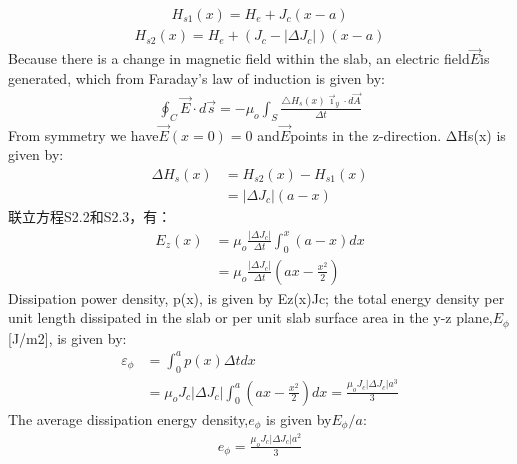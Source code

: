 \begin{align*}%
H_{s1}(x)=H_{e}+J_{c}(x-a)\tag{S2.1a}
\end{align*}
\begin{align*}%
H_{s2}(x)=H_{e}+(J_{c}-| \Delta J_{c}|)(x-a)\tag{S2.1b}
\end{align*}
Because there is a change in magnetic field
within the slab, an electric field$\vec{E}$is generated,
which from Faraday’s law of induction is
given by:
\begin{align*}%
\oint_{C}\vec{E}\cdot d\vec{s}=-\mu_{o}\int_{S}\frac{\triangle H_{s}(x)\vec{\imath}_{y}\cdot d\vec{A}}{\Delta t} \tag{S2.2}
\end{align*}
From symmetry we have$\vec{E}(x = 0) = 0$ and$\vec{E}$points in the z-direction. ΔHs(x)
is given by:
\begin{align*}%
\Delta H_{s}(x)&=H_{s2}(x)-H_{s1}(x)\\
&=|\Delta J_{c}|(a-x)\tag{S2.3}
\end{align*}
联立方程S2.2和S2.3，有：
\begin{align*}%
E_{z}(x)&=\mu_{o}\frac{|\Delta J_{c}|}{\Delta t}\int_{0}^{x}(a-x)dx\\
&=\mu_{o}\frac{|\Delta J_{c}|}{\Delta t}(ax-\frac{x^{2}}{2})\tag{S2.4}
\end{align*}
Dissipation power density, p(x), is given by Ez(x)Jc; the total energy density per
unit length dissipated in the slab or per unit slab surface area in the y-z plane,$E_\phi$
[J/m2], is given by:
\begin{align*}%
\varepsilon_{\phi}&=\int_{0}^{a}p(x)\Delta tdx\\
&=\mu_{o}J_{c}|\Delta J_{c}|\int_{0}^{a}(ax-\frac{x^{2}}{2})dx=\frac{\mu_{o}J_{c}|\Delta J_{c}|a^{3}}{3}\tag{S2.5}
\end{align*}
The average dissipation energy density,$e_\phi$ is given by$E_\phi/a$:
\begin{align*}%
e_{\phi}=\frac{\mu_{o}J_{c}|\Delta J_{c}|a^{2}}{3}\tag{5.37}
\end{align*}

